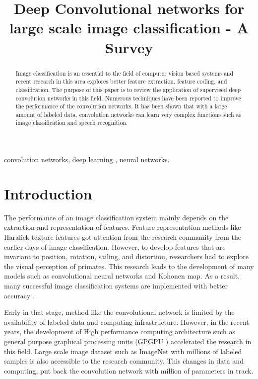 \documentclass{article}
\title { Deep Convolutional networks for large scale image classification - A Survey  }
\begin{document}
%
\maketitle
%
\begin{abstract}
Image classification is an essential to the field of computer vision  based systems and recent research in this area explores better feature extraction, feature coding, and classification.  The purpose of this paper is to review the application of supervised  deep convolution networks in this field.   Numerous techniques have been reported to improve the performance of the convolution networks.   It has been shown that with a large amount of labeled data, convolution networks can learn very complex functions such as image classification and speech recognition. 



\end{abstract}
%
\begin{keywords}
convolution networks, deep learning , neural networks.
\end{keywords}
%
\section{Introduction}
\label{sec:intro}
The performance of an  image  classification system mainly depends on the  extraction and  representation of features.  Feature representation methods like Haralick texture features \cite{Haralick1973} got attention from the research community from the earlier days of  image classification. However, to develop features that are invariant to position, rotation, sailing, and distortion, researchers had  to  explore the visual perception of primates. This research  leads to  the development of many models such as convolutional neural networks\cite{LeCun1998} and  Kohonen map\cite{kohonen1982self}. 
As a result, many successful image classification systems are  implemented with better accuracy \cite{lecun-89e}.

Early in that stage, method like the convolutional network is limited by the  availability of labeled  data and computing infrastructure.  However, in the recent years, the development of  High performance computing architecture such as general purpose graphical processing units (GPGPU )  accelerated the research in this field. Large scale image  dataset such as ImageNet\cite{imagenet}  with  millions of labeled samples is also accessible to the research community. This changes in data and computing, put back the convolution network with million of parameters in track. 
\end{document}
